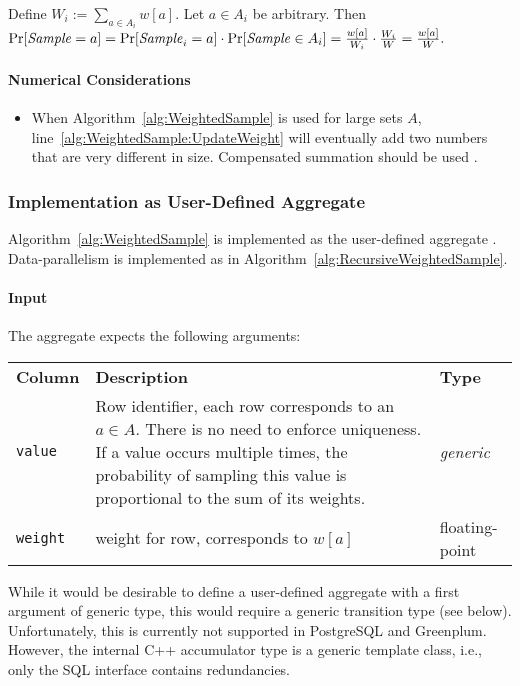 Define $W_i := \sum_{a \in A_i} w[a]$. Let $a \in A_i$ be arbitrary. Then $\Pr[\mathit{Sample} = a] = \Pr[\mathit{Sample}_i = a] \cdot \Pr[\mathit{Sample} \in A_i] = \frac{w[a]}{W_i} \cdot \frac{W_i}{W} = \frac{w[a]}{W}.$

\paragraph{Numerical Considerations}

\begin{itemize}
	\item When Algorithm~\ref{alg:WeightedSample} is used for large sets $A$, line~\ref{alg:WeightedSample:UpdateWeight} will eventually add two numbers that are very different in size. Compensated summation should be used \cite{ORO05a}.
\end{itemize}

\subsubsection{Implementation as User-Defined Aggregate}

Algorithm~\ref{alg:WeightedSample} is implemented as the user-defined aggregate . Data-parallelism is implemented as in Algorithm~\ref{alg:RecursiveWeightedSample}.

\paragraph{Input} The aggregate expects the following arguments:

\begin{center}
	\begin{tabularx}{\linewidth}{lXl}
		\toprule%
		\textbf{Column} & \textbf{Description} & \textbf{Type}
		\\\otoprule
		\texttt{value} &
		Row identifier, each row corresponds to an $a \in A$. There is no need to enforce uniqueness. If a value occurs multiple times, the probability of sampling this value is proportional to the sum of its weights. &
		\textit{generic}
		\\\midrule
		\texttt{weight} &
		weight for row, corresponds to $w[a]$ &
		floating-point
		\\\bottomrule
	\end{tabularx}
\end{center}
%
While it would be desirable to define a user-defined aggregate with a first argument of generic type, this would require a generic transition type (see below). Unfortunately, this is currently not supported in PostgreSQL and Greenplum. However, the internal C++ accumulator type is a generic template class, i.e., only the SQL interface contains redundancies.

